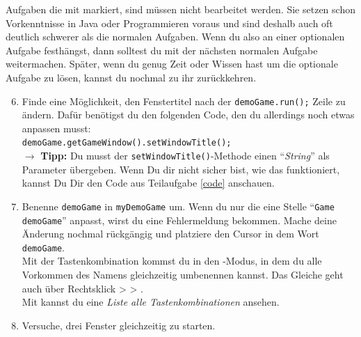 \begin{Infobox}
    Aufgaben die mit \optional markiert, sind müssen nicht bearbeitet werden.
    Sie setzen schon Vorkenntnisse in Java oder Programmieren voraus und sind deshalb auch oft deutlich schwerer als die normalen Aufgaben.
    Wenn du also an einer optionalen Aufgabe festhängst, dann solltest du mit der nächsten normalen Aufgabe weitermachen.
    Später, wenn du genug Zeit oder Wissen hast um die optionale Aufgabe zu lösen, kannst du nochmal zu ihr zurückkehren.
\end{Infobox}


\begin{enumerate} \setcounter{enumi}{5}
\item \optional Finde eine Möglichkeit, den Fenstertitel nach der \lstinline{demoGame.run();} Zeile zu ändern.
Dafür benötigst du den folgenden Code, den du allerdings noch etwas anpassen musst:\\
\hspace*{\fill}\lstinline{demoGame.getGameWindow().setWindowTitle();}\hspace*{\fill}\\
$\rightarrow$ \textbf{Tipp:} Du musst der \lstinline{setWindowTitle()}-Methode einen \enquote{\textit{String}} als Parameter übergeben. Wenn Du dir nicht sicher bist, wie das funktioniert, kannst Du Dir den Code aus Teilaufgabe \ref{code} anschauen.

\item \optional Benenne \lstinline{demoGame} in \lstinline{myDemoGame} um.
Wenn du nur die eine Stelle \enquote{\lstinline{Game demoGame}} anpasst, wirst du eine Fehlermeldung bekommen.
Mache deine Änderung nochmal rückgängig und platziere den Cursor in dem Wort \lstinline{demoGame}.\\
Mit der Tastenkombination  kommst du in den -Modus, in dem du alle Vorkommen des Namens gleichzeitig umbenennen kannst.
Das Gleiche geht auch über Rechtsklick >  > .\\
Mit  kannst du eine \textit{Liste alle Tastenkombinationen} ansehen.
\item \optional Versuche, drei Fenster gleichzeitig zu starten.
\end{enumerate}
